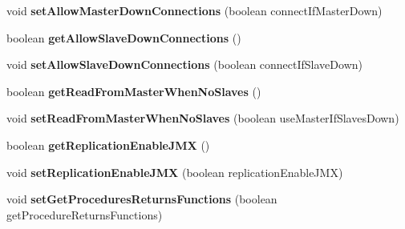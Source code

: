 \begin{DoxyCompactItemize}
void {\bfseries set\+Allow\+Master\+Down\+Connections} (boolean connect\+If\+Master\+Down)
\item 
\mbox{\label{classcom_1_1mysql_1_1jdbc_1_1_connection_properties_impl_a8fb45c0098984503595d45dec11e9d8f}} 
boolean {\bfseries get\+Allow\+Slave\+Down\+Connections} ()
\item 
\mbox{\label{classcom_1_1mysql_1_1jdbc_1_1_connection_properties_impl_ae715ae7a0495986ade6548c6db34a25a}} 
void {\bfseries set\+Allow\+Slave\+Down\+Connections} (boolean connect\+If\+Slave\+Down)
\item 
\mbox{\label{classcom_1_1mysql_1_1jdbc_1_1_connection_properties_impl_a9bb8be2aecee70aac5d6fb94f34a5b43}} 
boolean {\bfseries get\+Read\+From\+Master\+When\+No\+Slaves} ()
\item 
\mbox{\label{classcom_1_1mysql_1_1jdbc_1_1_connection_properties_impl_a81e81af7d3ef278f7ae6b8e10af072b2}} 
void {\bfseries set\+Read\+From\+Master\+When\+No\+Slaves} (boolean use\+Master\+If\+Slaves\+Down)
\item 
\mbox{\label{classcom_1_1mysql_1_1jdbc_1_1_connection_properties_impl_ae79e3553df4922242dc7036910c65dd3}} 
boolean {\bfseries get\+Replication\+Enable\+J\+MX} ()
\item 
\mbox{\label{classcom_1_1mysql_1_1jdbc_1_1_connection_properties_impl_accb57e39c76496affeadcdb851c9d349}} 
void {\bfseries set\+Replication\+Enable\+J\+MX} (boolean replication\+Enable\+J\+MX)
\item 
\mbox{\label{classcom_1_1mysql_1_1jdbc_1_1_connection_properties_impl_a2a5cf0e12aa5c6b678d6ea071bf86d26}} 
void {\bfseries set\+Get\+Procedures\+Returns\+Functions} (boolean get\+Procedure\+Returns\+Functions)
\item 
\mbox{\label{classcom_1_1mysql_1_1jdbc_1_1_connection_properties_impl_af65bb9ebede722698e1f5ee52c3b7a46}} 

\end{DoxyCompactItemize}
